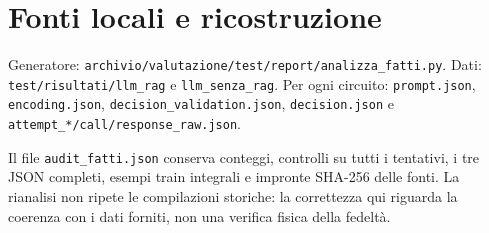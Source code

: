 \documentclass[a4paper,10pt]{article}
\begin{document}
\section*{Fonti locali e ricostruzione}
{\small\raggedright Generatore: \texttt{archivio/valutazione/test/report/analizza\_fatti.py}. Dati: \texttt{test/risultati/llm\_rag} e \texttt{llm\_senza\_rag}. Per ogni circuito: \texttt{prompt.json}, \texttt{encoding.json}, \texttt{decision\_validation.json}, \texttt{decision.json} e \texttt{attempt\_*/call/response\_raw.json}.\par}
Il file \texttt{audit\_fatti.json} conserva conteggi, controlli su tutti i tentativi, i tre JSON completi, esempi train integrali e impronte SHA-256 delle fonti. La rianalisi non ripete le compilazioni storiche: la correttezza qui riguarda la coerenza con i dati forniti, non una verifica fisica della fedeltà.
\end{document}
